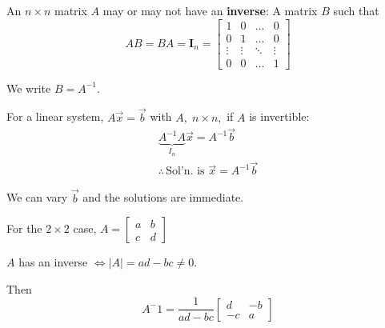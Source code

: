 \documentclass[../main.tex]{subfiles}
\begin{document}
An \( n \times n \) matrix \( A \) may or may not have an \textbf{inverse}: A matrix \( B \) such that
\[ AB=BA = \mathbf{I}_n = \begin{bmatrix}
    1 & 0 &  \dots  & 0 \\
    0 & 1 & \dots & 0 \\
    \vdots & \vdots & \ddots & \vdots \\
    0 & 0 & \dots  & 1
\end{bmatrix}
\]

We write \( B = A^{-1} \).

For a linear system, \( A \vec{x} = \vec{b} \) with \( A, \; n \times n, \) if \( A \) is invertible:
\begin{gather*}
    \underbrace{A^{-1}A}_{I_n} \vec{x} = A^{-1} \vec{b} \\
    \therefore \, \text{Sol'n. is } \vec{x} = A^{-1} \vec{b}
\end{gather*}

We can vary \( \vec{b} \) and the solutions are immediate.

For the \( 2 \times 2 \) case,
\( A = \begin{bmatrix}
    a & b \\
    c & d
\end{bmatrix} \)

\( A \) has an inverse \( \iff |A| = ad - bc \neq 0 \).

Then \[ A^-1 = \frac{1}{ad-bc}
    \begin{bmatrix}
        d & -b \\
        -c & a
    \end{bmatrix} 
\]
\end{document}
